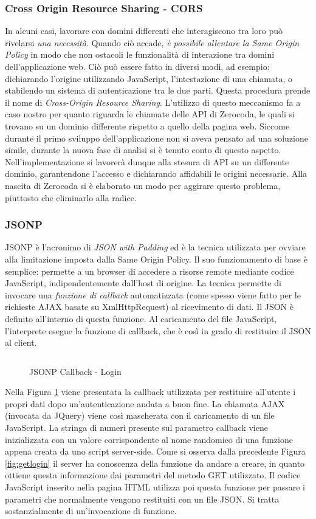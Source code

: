 \subsubsection{Cross Origin Resource Sharing - CORS}
In alcuni casi, lavorare con domini differenti che interagiscono tra loro può rivelarsi \textit{una necessità}. Quando ciò accade, \textit{è possibile allentare la Same Origin Policy} in modo che non ostacoli le funzionalità di interazione tra domini dell’applicazione web. Ciò può essere fatto in diversi modi, ad esempio: dichiarando l'origine utilizzando JavaScript, l'intestazione di una chiamata, o stabilendo un sistema di autenticazione tra le due parti. Questa procedura prende il nome di \textit{Cross-Origin Resource Sharing}. L'utilizzo di questo meccanismo fa a caso nostro per quanto riguarda le chiamate delle API di Zerocoda, le quali si trovano su un dominio differente rispetto a quello della pagina web. Siccome durante il primo sviluppo dell'applicazione non si aveva pensato ad una soluzione simile, durante la nuova fase di analisi si è tenuto conto di questo aspetto. Nell'implementazione si lavorerà dunque alla stesura di API su un differente dominio, garantendone l'accesso e dichiarando affidabili le origini necessarie. Alla nascita di Zerocoda si è elaborato un modo per aggirare questo problema, piuttosto che eliminarlo alla radice.

\subsubsection{JSONP}
JSONP è l’acronimo di \emph{JSON with Padding} ed è la tecnica utilizzata per ovviare alla limitazione imposta dalla Same Origin Policy. Il suo funzionamento di base è semplice: permette a un browser di accedere a risorse remote mediante codice JavaScript, indipendentemente dall’host di origine. La tecnica permette di invocare una \textit{funzione di callback} automatizzata (come spesso viene fatto per le richieste AJAX basate su XmlHttpRequest) al ricevimento di dati. Il JSON è definito all'interno di questa funzione. Al caricamento del file JavaScript, l'interprete esegue la funzione di callback, che è così in grado di restituire il JSON al client.
\begin{figure}[H]
    \inputminted{octave}{src/examples/jsonp.js}
    \caption{JSONP Callback - Login}
    \label{fig:jsonpexample}
\end{figure}
Nella Figura \ref{fig:jsonpexample} viene presentata la callback utilizzata per restituire all'utente i propri dati dopo un'autenticazione andata a buon fine. La chiamata AJAX (invocata da JQuery) viene così mascherata con il caricamento di un file JavaScript. La stringa di numeri presente sul parametro callback viene inizializzata con un valore corrispondente al nome randomico di una funzione appena creata da uno script server-side. Come si osserva dalla precedente Figura \ref{fig:getlogin} il server ha conoscenza della funzione da andare a creare, in quanto ottiene questa informazione dai parametri del metodo GET utilizzato. Il codice JavaScript inserito nella pagina HTML utilizza poi questa funzione per passare i parametri che normalmente vengono restituiti con un file JSON. Si tratta sostanzialmente di un'invocazione di funzione.

